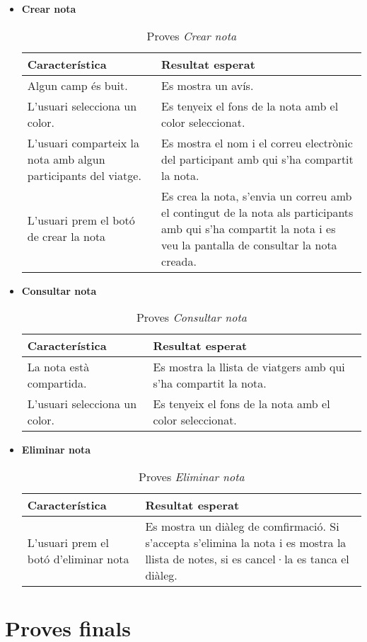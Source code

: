 \begin{itemize}
\item{}\textbf{Crear nota}

\begin{table}[!h]
\centering
\begin{tabular}{|T|T|}
\hline
\textbf{Característica}  & \textbf{Resultat esperat} \\\hline
Algun camp és buit. & Es mostra un avís.\\\hline
L'usuari selecciona un color. & Es tenyeix el fons de la nota amb el color seleccionat.\\\hline
L'usuari comparteix la nota amb algun participants del viatge. & Es mostra el nom i el correu electrònic del participant amb qui s'ha compartit la nota.\\\hline
L'usuari prem el botó de crear la nota & Es crea la nota, s'envia un correu amb el contingut de la nota als participants amb qui s'ha compartit la nota i es veu la pantalla de consultar la nota creada.\\\hline
\end{tabular}
\label{}
\caption{Proves \textit{Crear nota}}
\end{table}

\clearpage

\item{}\textbf{Consultar nota}

\begin{table}[!h]
\centering
\begin{tabular}{|T|T|}
\hline
\textbf{Característica}  & \textbf{Resultat esperat} \\\hline
La nota està compartida. & Es mostra la llista de viatgers amb qui s'ha compartit la nota.\\\hline
L'usuari selecciona un color. & Es tenyeix el fons de la nota amb el color seleccionat.\\\hline
\end{tabular}
\label{}
\caption{Proves \textit{Consultar nota}}
\end{table}

\item{}\textbf{Eliminar nota}

\begin{table}[!h]
\centering
\begin{tabular}{|T|T|}
\hline
\textbf{Característica}  & \textbf{Resultat esperat} \\\hline
L'usuari prem el botó d'eliminar nota & Es mostra un diàleg de comfirmació. Si s'accepta s'elimina la nota i es mostra la llista de notes, si es cancel·la es tanca el diàleg.\\\hline
\end{tabular}
\label{}
\caption{Proves \textit{Eliminar nota}}
\end{table}

\end{itemize}

\section{Proves finals}